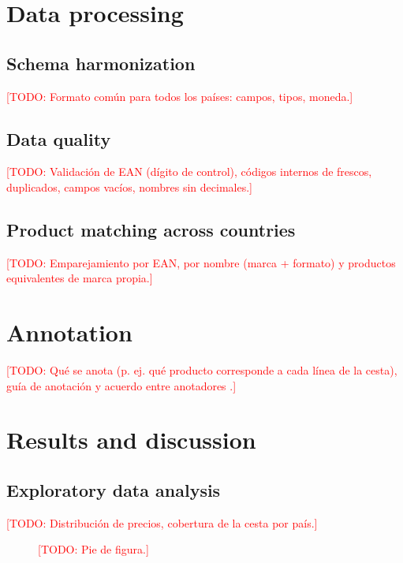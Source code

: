 \documentclass[11pt,a4paper,twocolumn]{article}
\newcommand{\todo}[1]{\textcolor{red}{[TODO: #1]}}
\begin{document}
\section{Data processing}

\subsection{Schema harmonization}
\todo{Formato común para todos los países: campos, tipos, moneda.}

\subsection{Data quality}
\todo{Validación de EAN (dígito de control), códigos internos de frescos, duplicados, campos vacíos, nombres sin decimales.}

\subsection{Product matching across countries}
\todo{Emparejamiento por EAN, por nombre (marca + formato) y productos equivalentes de marca propia.}

\section{Annotation}
\todo{Qué se anota (p. ej. qué producto corresponde a cada línea de la cesta), guía de anotación y acuerdo entre anotadores \cite{cohen1960}.}

\section{Results and discussion}

\subsection{Exploratory data analysis}
\todo{Distribución de precios, cobertura de la cesta por país.}

\begin{figure}[ht]
    \centering
    \framebox[\linewidth]{\rule{0pt}{4cm}\todo{figura}}
    \caption{\todo{Pie de figura.}}
    \label{fig:prices}
\end{figure}
\end{document}

